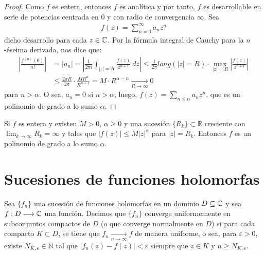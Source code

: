 \begin{proof}
    Como $f$ es entera, entonces $f$ es analítica y por tanto, $f$ es desarrollable en serie de potencias centrada en 0 y con radio de convergencia $\infty$. Sea
    \begin{align*}
        f(z) = \sum_{n=0}^{\infty}{a_nz^n}
    \end{align*}
    dicho desarrollo para cada $z \in \mathbb{C}$. Por la fórmula integral de Cauchy para la $n$-éseima derivada, nos dice que:
    \begin{align*}
        \left| \frac{f^{(n)}(0)}{n!} \right| & = |a_n| = \left| \frac{1}{2\pi i}\int_{|z| = R}{\frac{f(z)}{z^{n+1}} \ dz} \right| \leq \frac{1}{2\pi}long(|z| = R) \cdot \max_{|z| = R} \left| \frac{f(z)}{z^{n+1}} \right| \\
                                             & \leq \frac{2\pi R}{2\pi} \cdot \frac{MR^{\alpha}}{R^{n +1}} = M \cdot R^{\alpha - n} \xrightarrow[R \to \infty]{} 0
    \end{align*}
    para $n > \alpha$. O sea, $a_n = 0$ si $n > \alpha$, luego, $f(z) = \sum_{n\leq \alpha}{a_nz^n}$, que es un polinomio de grado a lo sumo $\alpha$.
\end{proof}

\begin{teo}[de Liouville]
    Si $f$ es entera y existen $M > 0$, $\alpha \ge 0$ y una sucesión $\{R_k\} \subset \mathbb{R}$ creciente con $\lim_{k \to \infty}{R_k} = \infty$ y tales que $|f(z)| \leq M|z|^{\alpha}$ para $|z| = R_k$. Entonces $f$ es un polinomio de grado a lo sumo $\alpha$.
\end{teo}

\section{Sucesiones de funciones holomorfas}

\begin{defi}
    Sea $\{f_n\}$ una sucesión de funciones holomorfas en un dominio $D \subseteq \mathbb{C}$ y sea $f: D \longrightarrow \mathbb{C}$ una función. Decimos que $\{f_n\}$ converge uniformemente en subconjuntos compactos de $D$ (o que converge normalmente en $D$) si para cada compacto $K \subset D$, se tiene que $f_n \xrightarrow[n \to \infty]{} f$ de manera uniforme, o sea, para $\varepsilon > 0$, existe $N_{K,\varepsilon} \in \mathbb{N}$ tal que $|f_n(z) - f(z)| < \varepsilon$ siempre que $z \in K$ y $n \ge N_{K,\varepsilon}$.
\end{defi}

